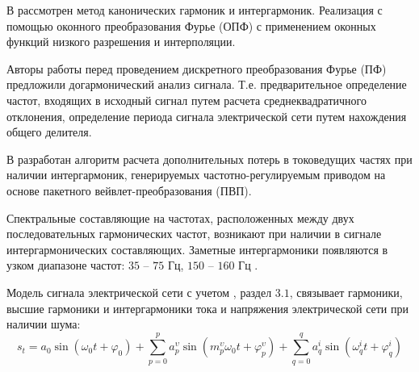 В \cite{Improving_methods_Shizma_2014} рассмотрен метод канонических гармоник и интергармоник. Реализация с помощью оконного преобразования Фурье (ОПФ) с применением оконных функций низкого разрешения и интерполяции. 


Авторы \cite{Harmonic_analysis_Goldstein2009} работы перед проведением дискретного преобразования Фурье (ПФ) предложили догармонический анализ сигнала. Т.е. предварительное определение частот, входящих в исходный сигнал путем расчета среднеквадратичного отклонения, определение периода сигнала электрической сети путем нахождения общего делителя. 


В \cite{Development_method_Osipov_2017} разработан алгоритм расчета дополнительных потерь в токоведущих частях при наличии интергармоник, генерируемых частотно-регулируемым приводом на основе пакетного вейвлет-преобразования (ПВП).

Спектральные составляющие на частотах, расположенных между двух последовательных гармонических частот, возникают при наличии в сигнале интергармонических составляющих. 
Заметные интергармоники появляются в узком диапазоне частот: $35$ – $75$ Гц, $150$ – $160$ Гц \cite{Interharmonics_in_systems_Zhezhelenko_1999}.

Модель сигнала электрической сети с учетом \cite{GOST30804.4.7-2013}, раздел $3.1$, связывает гармоники, высшие гармоники и интергармоники тока и напряжения электрической сети при наличии шума: 
\begin{equation}
	\label{eq:equation6}
	s_{t} = a_{0} \sin (\omega_{0} t + \varphi_{0}) + \displaystyle\sum_{p=0}^{p} a_p^{\upsilon} \sin (m_p^{\upsilon} \omega_{0} t + \varphi_p^{\upsilon}) + \displaystyle\sum_{q=0}^{q} a_q^i \sin  (\omega_q^i t + \varphi_q^{i})
\end{equation}

